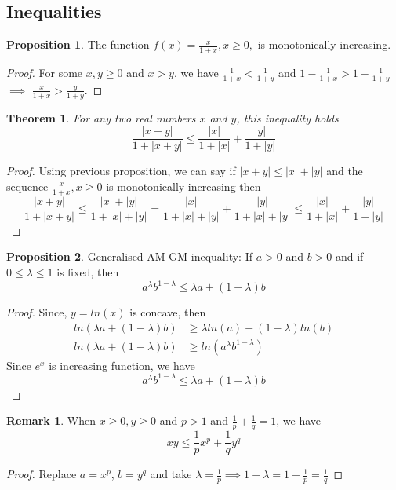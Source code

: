 \documentclass[12pt]{report}
\newtheorem{thm}{Theorem}
\theoremstyle{definition}
\newtheorem*{rem}{Remark}
\newtheorem{prop}{Proposition}
\begin{document}
\subsection*{Inequalities}
\begin{prop} \label{1}
    The function $f(x) = \frac{x}{1+x}, x \geq 0,$ is monotonically increasing. 
\end{prop}
\begin{proof}
    For some $x, y \geq 0$ and $x > y$, we have $\frac{1}{1+x} < \frac{1}{1+y}$ and $1-\frac{1}{1+x} > 1-\frac{1}{1+y}$ $\implies$ $ \frac{x}{1+x} > \frac{y}{1+y}$. 
\end{proof}
\begin{thm}
    For any two real numbers $x$ and $y$, this inequality holds
    $$ \frac{|x+y|}{1+|x+y|} \leq \frac{|x|}{1+|x|} + \frac{|y|}{1+|y|}$$
\end{thm}
\begin{proof}
    Using previous proposition, we can say if $|x+y| \leq |x| + |y|$ and the sequence $\frac{x}{1+x}, x \geq 0$ is monotonically increasing then
    $$ \frac{|x+y|}{1+|x+y|} \leq \frac{|x| + |y|}{1+ |x| + |y|} = \frac{|x|}{1+|x| + |y|} + \frac{|y|}{1+|x| + |y|} \leq \frac{|x|}{1+|x|} + \frac{|y|}{1+|y|}$$ 
\end{proof}
\begin{prop}
    Generalised AM-GM inequality: If $a > 0$ and $b > 0$ and if $0 \leq \lambda \leq 1$ is fixed, then
    $$ a^{\lambda}b^{1-\lambda} \leq \lambda a + (1-\lambda)b$$ 
\end{prop}
\begin{proof}
    Since, $ y = ln(x)$ is concave, then
    \begin{align*}
        ln(\lambda a + (1-\lambda)b) &\geq \lambda ln(a) + (1-\lambda)ln(b)\\
        ln(\lambda a + (1-\lambda)b) &\geq ln(a^{\lambda} b^{1-\lambda})
    \end{align*}
Since $e^x$ is increasing function, we have
$$ a^{\lambda} b^{1-\lambda} \leq \lambda a + (1-\lambda)b$$
\end{proof}
\begin{rem}
    When $x \geq 0, y \geq 0$ and $p > 1$ and $\frac{1}{p} + \frac{1}{q} = 1$, we have 
    $$ xy \leq \frac{1}{p}x^p + \frac{1}{q}y^q$$
\end{rem}
\begin{proof}
    Replace $ a = x^p$, $b = y^q$ and take $\lambda = \frac{1}{p} \implies 1-\lambda = 1- \frac{1}{p} = \frac{1}{q}$
\end{proof}
\end{document}
